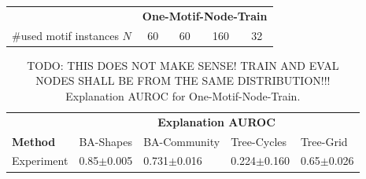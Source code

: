     \begin{tabular}{l|cccc}
    \midrule
    \textbf{} & \multicolumn{4}{c}{\textbf{One-Motif-Node-Train}} \\
    \addlinespace
    \toprule
    \#used motif instances $N$ & 60 & 60 & 160  & 32 \\
    \bottomrule
    \end{tabular}

  

\begin{table}[ht]
    \centering
    \scriptsize
    \begin{tabularx}{0.6\textwidth}{l*{4}{X}}   %
    \toprule
    \textbf{} & \multicolumn{4}{c}{\textbf{Explanation AUROC}} \\
    \cmidrule{2-5}
    \textbf{Method} & BA-Shapes & BA-Community & Tree-Cycles & Tree-Grid \\
    \midrule
    Experiment & 0.85$\pm$0.005 & 0.731$\pm$0.016 & 0.224$\pm$0.160 & 0.65$\pm$0.026 \\
    \bottomrule
    \end{tabularx}
    \caption[REM]{TODO: THIS DOES NOT MAKE SENSE! TRAIN AND EVAL NODES SHALL BE FROM THE SAME DISTRIBUTION!!! Explanation AUROC for One-Motif-Node-Train.}
    \label{tab:allmotifnodes_selected_rem}
\end{table}